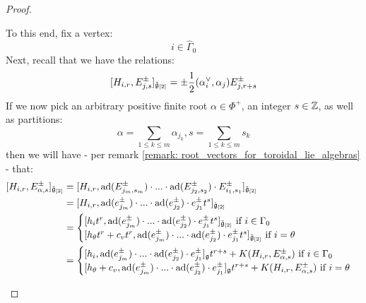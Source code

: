 \begin{proof}
\begin{itemize}
                    To this end, fix a vertex:
                        $$i \in \hat{\Gamma}_0$$
                    Next, recall that we have the relations:
                        $$[H_{i, r}, E_{j, s}^{\pm}]_{\tilde{\g}_{[2]}} = \pm \frac12 (\alpha_i^{\vee}, \alpha_j) E_{j, r + s}^{\pm}$$
                    If we now pick an arbitrary positive finite root $\alpha \in \Phi^+$, an integer $s \in \Z$, as well as partitions: 
                        $$\alpha = \sum_{1 \leq k \leq m} \alpha_{j_k}, s = \sum_{1 \leq k \leq m} s_k$$
                    then we will have - per remark \ref{remark: root_vectors_for_toroidal_lie_algebras} - that:
                        $$
                            \begin{aligned}
                                [H_{i, r}, E_{\alpha, s}^{\pm}]_{\tilde{\g}_{[2]}} & = [ H_{i, r}, \ad(E_{j_m, s_m}^{\pm}) \cdot ... \cdot \ad(E_{j_2, s_2}^{\pm}) \cdot E_{i_1, s_1}^{\pm} ]_{\tilde{\g}_{[2]}}
                                \\
                                & = [ H_{i, r}, \ad(e_{j_m}^{\pm}) \cdot ... \cdot \ad(e_{j_2}^{\pm}) \cdot e_{j_1}^{\pm} t^s ]_{\tilde{\g}_{[2]}}
                                \\
                                & = 
                                \begin{cases}
                                    \text{$[ h_i t^r, \ad(e_{j_m}^{\pm}) \cdot ... \cdot \ad(e_{j_2}^{\pm}) \cdot e_{j_1}^{\pm} t^s ]_{\tilde{\g}_{[2]}}$ if $i \in \Gamma_0$}
                                    \\
                                    \text{$[ h_{\theta} t^r + c_v t^r, \ad(e_{j_m}^{\pm}) \cdot ... \cdot \ad(e_{j_2}^{\pm}) \cdot e_{j_1}^{\pm} t^s ]_{\tilde{\g}_{[2]}}$ if $i = \theta$}
                                \end{cases}
                                \\
                                & = 
                                \begin{cases}
                                    \text{$[ h_i, \ad(e_{j_m}^{\pm}) \cdot ... \cdot \ad(e_{j_2}^{\pm}) \cdot e_{j_1}^{\pm} ]_{\g} t^{r + s} + K(H_{i, r}, E_{\alpha, s}^{\pm})$ if $i \in \Gamma_0$}
                                    \\
                                    \text{$[ h_{\theta} + c_v, \ad(e_{j_m}^{\pm}) \cdot ... \cdot \ad(e_{j_2}^{\pm}) \cdot e_{j_1}^{\pm} ]_{\g} t^{r + s} + K(H_{i, r}, E_{\alpha, s}^{\pm})$ if $i = \theta$}
                                \end{cases}

\end{aligned}$$
\end{itemize}
\end{proof}
